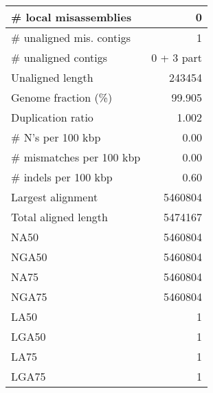 \documentclass[12pt,a4paper]{article}
\begin{document}
\begin{table}[ht]
\begin{center}
\begin{tabular}{|l*{1}{|r}|}
\# local misassemblies & 0 \\ \hline
\# unaligned mis. contigs & 1 \\ \hline
\# unaligned contigs & 0 + 3 part \\ \hline
Unaligned length & 243454 \\ \hline
Genome fraction (\%) & 99.905 \\ \hline
Duplication ratio & 1.002 \\ \hline
\# N's per 100 kbp & 0.00 \\ \hline
\# mismatches per 100 kbp & 0.00 \\ \hline
\# indels per 100 kbp & 0.60 \\ \hline
Largest alignment & 5460804 \\ \hline
Total aligned length & 5474167 \\ \hline
NA50 & 5460804 \\ \hline
NGA50 & 5460804 \\ \hline
NA75 & 5460804 \\ \hline
NGA75 & 5460804 \\ \hline
LA50 & 1 \\ \hline
LGA50 & 1 \\ \hline
LA75 & 1 \\ \hline
LGA75 & 1 \\ \hline
\end{tabular}
\end{center}
\end{table}
\end{document}
